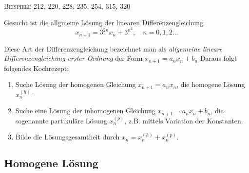 \documentclass[a4paper, 12pt, margins=3cm]{homework}
\begin{document}
  \begin{center}
    \textsc{Beispiele 212, 220, 228, 235, 254, 315, 320}
  \end{center}


  \begin{problem}
    Gesucht ist die allgmeine Lösung der linearen Differenzengleichung
    \[ x_{n+1} = 3^{2n}x_n+3^{n^2}, \quad n = 0,1,2... \]
  \end{problem}
  \begin{solution}
    Diese Art der Differenzengleichung bezeichnet man als \emph{allgemeine 
    lineare Differenzengleichung erster Ordnung} der Form $x_{n+1} = a_n x_n + b_n$
    Daraus folgt folgendes Kochrezept:
    \begin{enumerate}\itemsep0pt
      \item Suche Lösung der homogenen Gleichung $x_{n+1} = a_nx_n$, die homogene
      Lösung $x_n^{(h)}$.
      \item Suche eine Lösung der inhomogenen Gleichung $x_{n+1} = a_nx_n+b_n$,
      die sogenannte partikuläre Lösung $x_n^{(p)}$, z.B. mittels Variation der
      Konstanten.
      \item Bilde die Lösungsgesamtheit durch $x_n = x_n^{(h)} + x_n^{(p)}$.
    \end{enumerate}
    \subsection*{Homogene Lösung}
  \end{solution}
\end{document}
